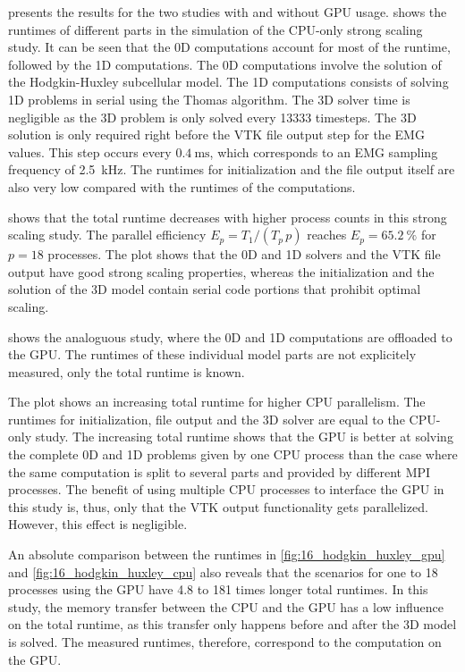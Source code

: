  presents the results for the two studies with and without GPU usage.  shows the runtimes of different parts in the simulation of the CPU-only strong scaling study. It can be seen that the 0D computations account for most of the runtime, followed by the 1D computations. The 0D computations involve the solution of the Hodgkin-Huxley subcellular model. The 1D computations consists of solving 1D problems in serial using the Thomas algorithm. The 3D solver time is negligible as the 3D problem is only solved every \num{13333} timesteps. The 3D solution is only required right before the VTK file output step for the EMG values. This step occurs every $\SI{0.4}{\ms}$, which corresponds to an EMG sampling frequency of \SI{2.5}{\kilo\hertz}.
The runtimes for initialization and the file output itself are also very low compared with the runtimes of the computations.

 shows that the total runtime decreases with higher process counts in this strong scaling study. The parallel efficiency $E_p = T_1/(T_p\,p)$ reaches $E_p=\SI{65.2}{\percent}$ for $p=18$ processes. The plot shows that the 0D and 1D solvers and the VTK file output have good strong scaling properties, whereas the initialization and the solution of the 3D model contain serial code portions that prohibit optimal scaling.

 shows the analoguous study, where the 0D and 1D computations are offloaded to the GPU. The runtimes of these individual model parts are not explicitely measured, only the total runtime is known.

The plot shows an increasing total runtime for higher CPU parallelism. 
The runtimes for initialization, file output and the 3D solver are equal to the CPU-only study.
The increasing total runtime shows that the GPU is better at solving the complete 0D and 1D problems given by one CPU process than the case where the same computation is split to several parts and provided by different MPI processes. The benefit of using multiple CPU processes to interface the GPU in this study is, thus, only that the VTK output functionality gets parallelized. However, this effect is negligible.

An absolute comparison between the runtimes in \cref{fig:16_hodgkin_huxley_gpu} and \cref{fig:16_hodgkin_huxley_cpu} also reveals that the scenarios for one to 18 processes using the GPU have 4.8 to 181 times longer total runtimes. In this study, the memory transfer between the CPU and the GPU has a low influence on the total runtime, as this transfer only happens before and after the 3D model is solved. The measured runtimes, therefore, correspond to the computation on the GPU.

